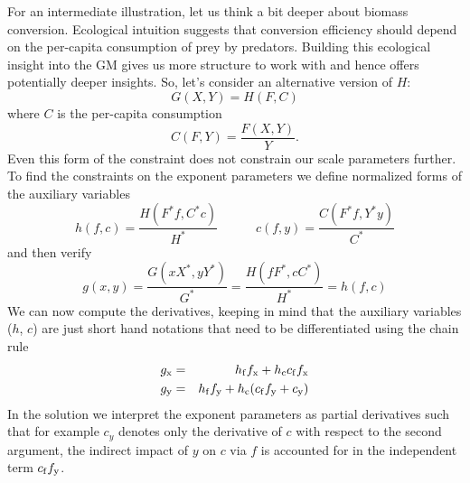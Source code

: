 \documentclass{article}
\newcommand{\eq}[1]{\begin{equation}#1\end{equation}}
\newcommand{\eqa}[1]{\begin{eqnarray}#1\end{eqnarray}}
\begin{document}
For an intermediate illustration, let us think a bit deeper about biomass conversion. Ecological intuition suggests that conversion efficiency should depend on the per-capita consumption of prey by predators. Building this ecological insight into the GM gives us more structure to work with and hence offers potentially deeper insights. So, let's consider an alternative version of $H$: 
\eq{
G(X,Y)=H(F,C)
}
where $C$ is the per-capita consumption 
\eq{
C(F,Y)=\frac{F(X,Y)}{Y}.
}
Even this form of the constraint does not constrain our scale parameters further. To find the constraints on the exponent parameters we define normalized forms of the auxiliary variables
\eq{
h(f,c)=\frac{H(F^*f,C^*c)}{H^*}\quad\quad\quad c(f,y)=\frac{C(F^*f,Y^*y)}{C^*}
}
and then verify
\eq{
g(x,y)=\frac{G(xX^*,yY^*)}{G^*}=\frac{H(fF^*,cC^*)}{H^*} = h(f,c)
}
We can now compute the derivatives, keeping in mind that the auxiliary variables ($h$, $c$) are just short hand notations that need to be differentiated using the chain rule
\eqa{
g_{\rm x} &=& h_{\rm f}f_{\rm x} + h_{\rm c}c_{\rm f}f_{\rm x} \\
g_{\rm y} &=& h_{\rm f}f_{\rm y} + h_{\rm c}(c_{\rm f}f_{\rm y}+c_{\rm y}) 
}
In the solution we interpret the exponent parameters as partial derivatives such that for example $c_y$ denotes only the derivative of $c$ with respect to the second argument, the indirect impact of $y$ on $c$ via $f$ is accounted for in the independent term $c_{\rm f}f_{\rm y}$. 
\end{document}
